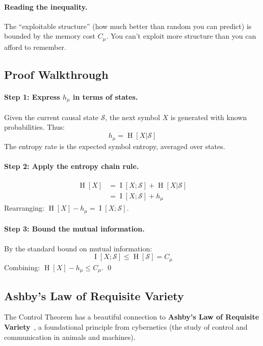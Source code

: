 \documentclass[11pt,a4paper]{article}
\theoremstyle{definition}
\theoremstyle{plain}
\newcommand{\Cmu}{C_\mu}
\newcommand{\hmu}{h_\mu}
\newcommand{\calS}{\mathcal{S}}
\DeclareMathOperator{\Ent}{H}
\DeclareMathOperator{\MI}{I}
\begin{document}
\paragraph{Reading the inequality.} The ``exploitable structure'' (how much better than random you can predict) is bounded by the memory cost $\Cmu$. You can't exploit more structure than you can afford to remember.

\subsection{Proof Walkthrough}

\paragraph{Step 1: Express $\hmu$ in terms of states.}
Given the current causal state $\calS$, the next symbol $X$ is generated with known probabilities. Thus:
\begin{equation}
    \hmu = \Ent[X | \calS]
\end{equation}
The entropy rate is the expected symbol entropy, averaged over states.

\paragraph{Step 2: Apply the entropy chain rule.}
\begin{align}
    \Ent[X] &= \MI[X; \calS] + \Ent[X | \calS] \\
    &= \MI[X; \calS] + \hmu
\end{align}
Rearranging: $\Ent[X] - \hmu = \MI[X; \calS]$.

\paragraph{Step 3: Bound the mutual information.}
By the standard bound on mutual information:
\begin{equation}
    \MI[X; \calS] \leq \Ent[\calS] = \Cmu
\end{equation}
Combining: $\Ent[X] - \hmu \leq \Cmu$. \qed

\subsection{Ashby's Law of Requisite Variety}

The Control Theorem has a beautiful connection to \textbf{Ashby's Law of Requisite Variety}~\cite{ashby1956introduction}, a foundational principle from cybernetics (the study of control and communication in animals and machines).
\end{document}

